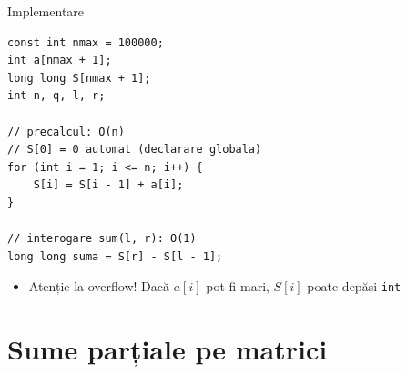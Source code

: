 ﻿\documentclass{beamer}
\begin{document}
\begin{frame}{Implementare}
  \begin{lstlisting}
const int nmax = 100000;
int a[nmax + 1];
long long S[nmax + 1];
int n, q, l, r;

// precalcul: O(n)
// S[0] = 0 automat (declarare globala)
for (int i = 1; i <= n; i++) {
    S[i] = S[i - 1] + a[i];
}

// interogare sum(l, r): O(1)
long long suma = S[r] - S[l - 1];
  \end{lstlisting}

  \begin{itemize}
    \item \alert{Atenție la overflow!} Dacă $a[i]$ pot fi mari, $S[i]$ poate depăși \texttt{int}
  \end{itemize}
\end{frame}

\section{Sume parțiale pe matrici}
\end{document}
